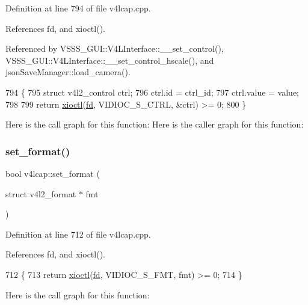 Definition at line 794 of file v4lcap.\+cpp.



References fd, and xioctl().



Referenced by V\+S\+S\+S\+\_\+\+G\+U\+I\+::\+V4\+L\+Interface\+::\+\_\+\+\_\+set\+\_\+control(), V\+S\+S\+S\+\_\+\+G\+U\+I\+::\+V4\+L\+Interface\+::\+\_\+\+\_\+set\+\_\+control\+\_\+hscale(), and json\+Save\+Manager\+::load\+\_\+camera().


\begin{DoxyCode}
794                                                \{
795     \textcolor{keyword}{struct }v4l2\_control ctrl;
796     ctrl.id = ctrl\_id;
797     ctrl.value = value;
798 
799     \textcolor{keywordflow}{return} \hyperlink{classv4lcap_ab5aaa5a8c0df17f5ca57e0b5170232cb}{xioctl}(\hyperlink{classv4lcap_a38109593bde997dad13b3a461569573d}{fd}, VIDIOC\_S\_CTRL, &ctrl) >= 0;
800 \}
\end{DoxyCode}
Here is the call graph for this function\+:
Here is the caller graph for this function\+:
\mbox{\label{classv4lcap_aedf12169721a174af1c2eea5244ff5d7}} 
\subsubsection{\texorpdfstring{set\+\_\+format()}{set\_format()}}
{\footnotesize\ttfamily bool v4lcap\+::set\+\_\+format (\begin{DoxyParamCaption}\item[{struct v4l2\+\_\+format $\ast$}]{fmt }\end{DoxyParamCaption})}



Definition at line 712 of file v4lcap.\+cpp.



References fd, and xioctl().


\begin{DoxyCode}
712                                                 \{
713     \textcolor{keywordflow}{return} \hyperlink{classv4lcap_ab5aaa5a8c0df17f5ca57e0b5170232cb}{xioctl}(\hyperlink{classv4lcap_a38109593bde997dad13b3a461569573d}{fd}, VIDIOC\_S\_FMT, fmt) >= 0;
714 \}
\end{DoxyCode}
Here is the call graph for this function\+:
\mbox{\label{classv4lcap_a698e7d4dcefeda932ecbab7bfccdc491}} 
